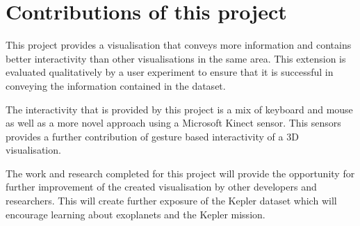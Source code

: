 \section{Contributions of this project}
This project provides a visualisation that conveys more information and
contains better interactivity than other visualisations in the same area. This
extension is evaluated qualitatively by a user experiment to ensure that it
is successful in conveying the information contained in the dataset.

The interactivity that is provided by this project is a mix of keyboard and
mouse as well as a more novel approach using a Microsoft Kinect sensor. This
sensors provides a further contribution of gesture based interactivity of a 3D
visualisation.

The work and research completed for this project will provide the opportunity
for further improvement of the created visualisation by other developers and
researchers. This will create further exposure of the Kepler dataset which will
encourage learning about exoplanets and the Kepler mission.
